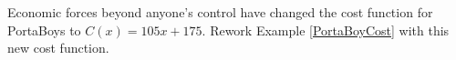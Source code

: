 {\label{exerredoportaboy} Economic forces beyond anyone's control have changed the cost function for PortaBoys to $C(x) = 105x + 175$.  Rework Example \ref{PortaBoyCost} with this new cost function.}
{
}